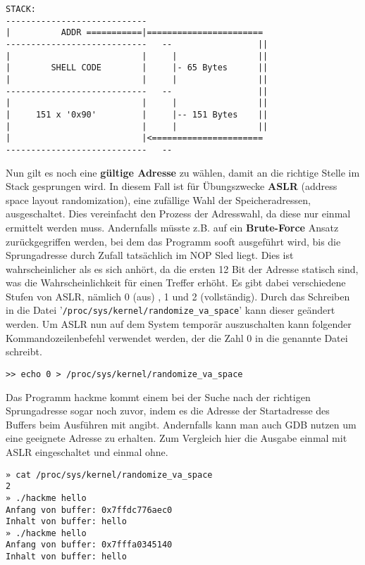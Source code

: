 \documentclass[12pt]{article}
\begin{document}
\begin{lstlisting}
STACK:
----------------------------
|          ADDR ===========|=======================
----------------------------   --                 ||
|                          |     |                ||
|        SHELL CODE        |     |- 65 Bytes      ||
|                          |     |                ||
----------------------------   --                 ||
|                          |     |                ||
|     151 x '0x90'         |     |-- 151 Bytes    ||
|                          |     |                ||
|                          |<======================
----------------------------   --
\end{lstlisting}


Nun gilt es noch eine \textbf{gültige Adresse} zu wählen, damit an die richtige Stelle im Stack gesprungen wird. In diesem Fall ist für Übungszwecke \textbf{ASLR} (address space layout randomization), eine zufällige Wahl der Speicheradressen, ausgeschaltet. Dies vereinfacht den Prozess der Adresswahl, da diese nur einmal ermittelt werden muss. Andernfalls müsste z.B. auf ein \textbf{Brute-Force} Ansatz zurückgegriffen werden, bei dem das Programm sooft ausgeführt wird, bis die Sprungadresse durch Zufall tatsächlich im NOP Sled liegt. Dies ist wahrscheinlicher als es sich anhört, da die ersten 12 Bit der Adresse statisch sind, was die Wahrscheinlichkeit für einen Treffer erhöht.
\newline
\newline
Es gibt dabei verschiedene Stufen von ASLR, nämlich 0 (aus) , 1 und 2 (vollständig). Durch das Schreiben in die Datei '\texttt{/proc/sys/kernel/randomize\_va\_space}' kann dieser geändert werden.
Um ASLR nun auf dem System temporär auszuschalten kann folgender Kommandozeilenbefehl verwendet werden, der die Zahl 0 in die genannte Datei schreibt.

\begin{lstlisting}
>> echo 0 > /proc/sys/kernel/randomize_va_space
\end{lstlisting}
Das Programm hackme kommt einem bei der Suche nach der richtigen Sprungadresse sogar noch zuvor, indem es die Adresse der Startadresse des Buffers beim Ausführen mit angibt. Andernfalls kann man auch GDB nutzen um eine geeignete Adresse zu erhalten.
\newline
\newline
Zum Vergleich hier die Ausgabe einmal mit ASLR eingeschaltet und einmal ohne.
\begin{lstlisting}[caption={ASLR enabled}, captionpos=t]
» cat /proc/sys/kernel/randomize_va_space     
2
» ./hackme hello                              
Anfang von buffer: 0x7ffdc776aec0
Inhalt von buffer: hello
» ./hackme hello                              
Anfang von buffer: 0x7fffa0345140
Inhalt von buffer: hello
\end{lstlisting}
\end{document}
